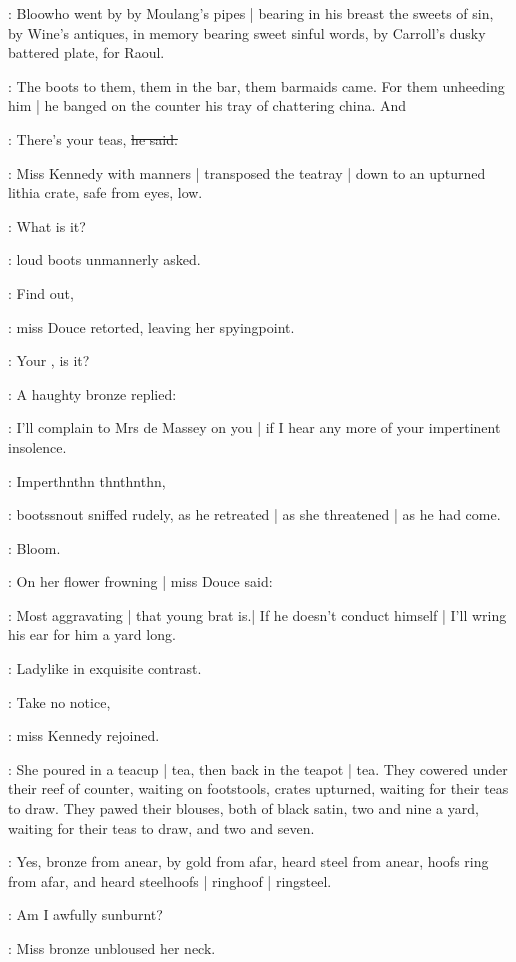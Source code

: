 :
Bloowho went by by Moulang's pipes |
bearing in his breast the sweets of sin,
by Wine's antiques,
in memory bearing sweet sinful words,
by Carroll's dusky battered plate,
for Raoul.

:
The boots to them,
them in the bar,
them barmaids came.
For them unheeding him |
he banged on the counter his tray of chattering china.
And

\boots:
There's your teas,
\sout{he said.}

:
Miss Kennedy with manners |
transposed the teatray |
down to an upturned lithia crate,
safe from eyes,
low.

\boots:
What is it?

:
loud boots unmannerly asked.

\MissD:
Find out,

:
miss Douce retorted,
leaving her spyingpoint.

\boots:
Your ,
is it?

:
A haughty bronze replied:

\MissD:
I'll complain to Mrs de Massey on you |
if I hear any more of your impertinent insolence.

\boots:
Imperthnthn thnthnthn,

:
bootssnout sniffed rudely,
as he retreated |
as she threatened |
as he had come.

:
Bloom.

:
On her flower frowning |
miss Douce said:

\MissD:
Most aggravating |
that young brat is.|
If he doesn't conduct himself |
I'll wring his ear for him a yard long.

:
Ladylike in exquisite contrast.

\MissK:
Take no notice,

:
miss Kennedy rejoined.

:
She poured in a teacup |
tea,
then back in the teapot |
tea.
They cowered under their reef of counter,
waiting on footstools,
crates upturned,
waiting for their teas to draw.
They pawed their blouses,
both of black satin,
two and nine a yard,
waiting for their teas to draw,
and two and seven.

:
Yes,
bronze from anear,
by gold from afar,
heard steel from anear,
hoofs ring from afar,
and heard steelhoofs |
ringhoof |
ringsteel.

\MissD:
Am I awfully sunburnt?

:
Miss bronze unbloused her neck.

